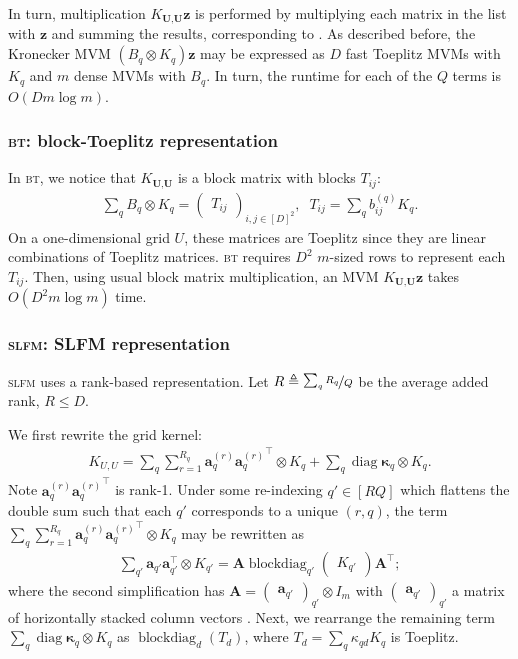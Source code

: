 \documentclass{article}
\def\bsk{{\boldsymbol\kappa}}
\def\TU{\textbf{U}}
\def\Tz{\textbf{z}}
\DeclareMathOperator\blockdiag{blockdiag}
\newcommand{\colv}[1]{\begin{pmatrix} #1 \end{pmatrix}}
\newcommand{\mat}[1]{\begin{pmatrix} #1 \end{pmatrix}}
\DeclareMathOperator{\diag}{diag}
\begin{document}
In turn, multiplication $K_{\TU,\TU}\Tz$ is performed by multiplying each matrix in the list with $\Tz$ and summing the results, corresponding to . As described before, the Kronecker MVM $(B_q\otimes K_q)\Tz$ may be expressed as $D$ fast Toeplitz MVMs with $K_q$ and $m$ dense MVMs with $B_q$. In turn, the runtime for each of the $Q$ terms is $O(Dm\log m)$.

\subsubsection{\textsc{bt}: block-Toeplitz representation}

In \textsc{bt}, we notice that $K_{\TU,\TU}$ is a block matrix with blocks $T_{ij}$:
\begin{align*}
\sum_qB_q\otimes K_q =\mat{T_{ij}}_{i,j\in[D]^2},\;\; T_{ij}=\sum_qb_{ij}^{(q)}K_q.
\end{align*}
On a one-dimensional grid $U$, these matrices are Toeplitz since they are linear combinations of Toeplitz matrices. \textsc{bt} requires $D^2$ $m$-sized rows to represent each $T_{ij}$. Then, using usual block matrix multiplication, an MVM $K_{\TU,\TU}\Tz$ takes $O(D^2m\log m)$ time.

\subsubsection{\textsc{slfm}: SLFM representation}

\textsc{slfm} uses a rank-based representation. Let $R\triangleq \nicefrac{\sum_qR_q}{Q}$ be the average added rank, $R\le D$.

We first rewrite the grid kernel:
\begin{align*}
  K_{U,U}=\sum_q\sum_{r=1}^{R_q}\textbf{a}_q^{(r)}{\textbf{a}_q^{(r)}}^\top\otimes K_q + \sum_q\diag\bsk_q \otimes K_q.
\end{align*}
Note $\textbf{a}_q^{(r)}{\textbf{a}_q^{(r)}}^\top$ is rank-1. Under some re-indexing $q'\in[RQ]$ which flattens the double sum such that each $q'$ corresponds to a unique $(r, q)$, the term $\sum_q\sum_{r=1}^{R_q}\textbf{a}_q^{(r)}{\textbf{a}_q^{(r)}}^\top\otimes K_q $ may be rewritten as
\begin{align*}
  \sum_{q'}\textbf{a}_{q'}\textbf{a}_{q'}^\top\otimes K_{q'} = \textbf{A}\blockdiag_{q'}\colv{K_{q'}}\textbf{A}^\top;
\end{align*}
where the second simplification has $\textbf{A}=\mat{ \textbf{a}_{q'}}_{q'}\otimes I_m$ with $\mat{ \textbf{a}_{q'}}_{q'}$ a matrix of horizontally stacked column vectors \cite{seeger2005semiparametric}. Next, we rearrange the remaining term $\sum_q\diag\bsk_q \otimes K_q$ as $\blockdiag_d(T_d)$, where $T_d=\sum_q \kappa_{qd}K_q$ is Toeplitz.
\end{document}
